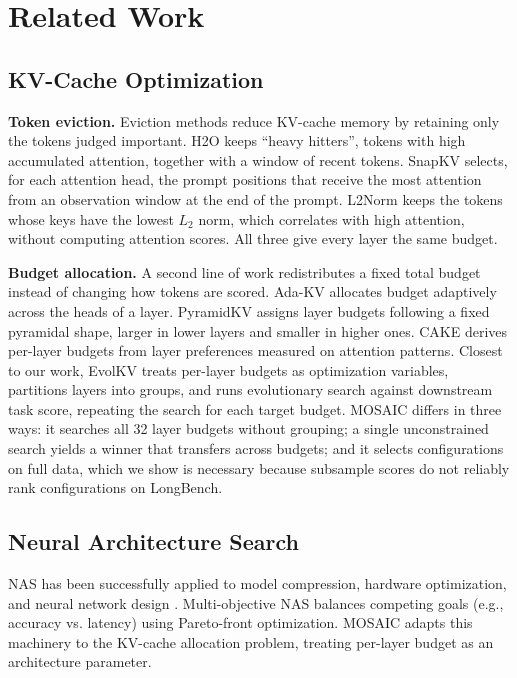 \documentclass[11pt]{article}
\begin{document}
\section{Related Work}

\subsection{KV-Cache Optimization}

\textbf{Token eviction.} Eviction methods reduce KV-cache memory by retaining only the tokens judged important. H2O \citep{zhang2023h2o} keeps ``heavy hitters'', tokens with high accumulated attention, together with a window of recent tokens. SnapKV \citep{li2024snapkv} selects, for each attention head, the prompt positions that receive the most attention from an observation window at the end of the prompt. L2Norm \citep{devoto2024l2norm} keeps the tokens whose keys have the lowest $L_2$ norm, which correlates with high attention, without computing attention scores. All three give every layer the same budget.

\textbf{Budget allocation.} A second line of work redistributes a fixed total budget instead of changing how tokens are scored. Ada-KV \citep{feng2025adakv} allocates budget adaptively across the heads of a layer. PyramidKV \citep{cai2025pyramidkv} assigns layer budgets following a fixed pyramidal shape, larger in lower layers and smaller in higher ones. CAKE \citep{qin2025cake} derives per-layer budgets from layer preferences measured on attention patterns. Closest to our work, EvolKV \citep{yu2025evolkv} treats per-layer budgets as optimization variables, partitions layers into groups, and runs evolutionary search against downstream task score, repeating the search for each target budget. MOSAIC differs in three ways: it searches all 32 layer budgets without grouping; a single unconstrained search yields a winner that transfers across budgets; and it selects configurations on full data, which we show is necessary because subsample scores do not reliably rank configurations on LongBench.

\subsection{Neural Architecture Search}

NAS has been successfully applied to model compression, hardware optimization, and neural network design \citep{elsken2018neural}. Multi-objective NAS balances competing goals (e.g., accuracy vs. latency) using Pareto-front optimization. MOSAIC adapts this machinery to the KV-cache allocation problem, treating per-layer budget as an architecture parameter.
\end{document}
